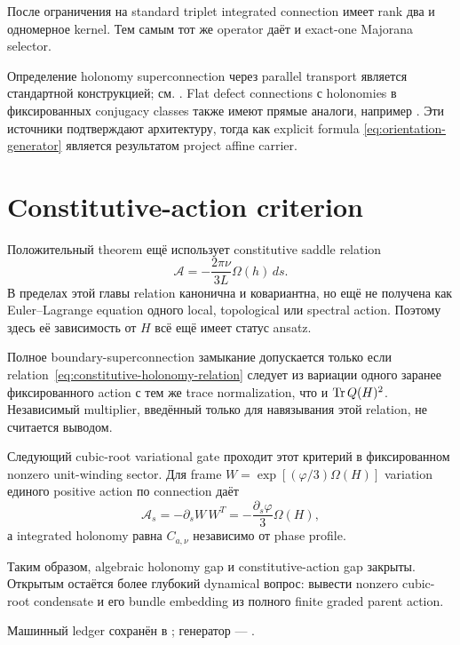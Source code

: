 После ограничения на standard triplet integrated connection имеет rank
два и одномерное kernel. Тем самым тот же operator даёт и exact-one
Majorana selector.

Определение holonomy superconnection через parallel transport является
стандартной конструкцией; см. . Flat defect
connections с holonomies в фиксированных conjugacy classes также имеют
прямые аналоги, например . Эти источники
подтверждают архитектуру, тогда как explicit formula
\eqref{eq:orientation-generator} является результатом project affine
carrier.

\section{Constitutive-action criterion}

Положительный theorem ещё использует constitutive saddle relation
\begin{equation}
 \mathcal A
 =-\frac{2\pi\nu}{3L}\Omega(h)\,ds.
 \label{eq:constitutive-holonomy-relation}
\end{equation}
В пределах этой главы relation канонична и ковариантна, но ещё не получена
как Euler--Lagrange equation одного local, topological или spectral action.
Поэтому здесь её зависимость от \(H\) всё ещё имеет статус ansatz.

\begin{nogocriterion}
Полное boundary-superconnection замыкание допускается только если
relation~\eqref{eq:constitutive-holonomy-relation} следует из вариации
одного заранее фиксированного action с тем же trace normalization, что и
\(\operatorname{Tr} Q(H)^2\). Независимый multiplier, введённый только для навязывания
этой relation, не считается выводом.
\end{nogocriterion}

Следующий cubic-root variational gate проходит этот критерий в фиксированном
nonzero unit-winding sector. Для frame
\(W=\exp[(\varphi/3)\Omega(H)]\) variation единого positive action по
connection даёт
\begin{equation}
 \mathcal A_s=-\partial_sW\,W^T
 =-\frac{\partial_s\varphi}{3}\Omega(H),
\end{equation}
а integrated holonomy равна \(C_{a,\nu}\) независимо от phase profile.

Таким образом, algebraic holonomy gap и constitutive-action gap закрыты.
Открытым остаётся более глубокий dynamical вопрос: вывести nonzero
cubic-root condensate и его bundle embedding из полного finite graded
parent action.

Машинный ledger сохранён в
;
генератор ---
.